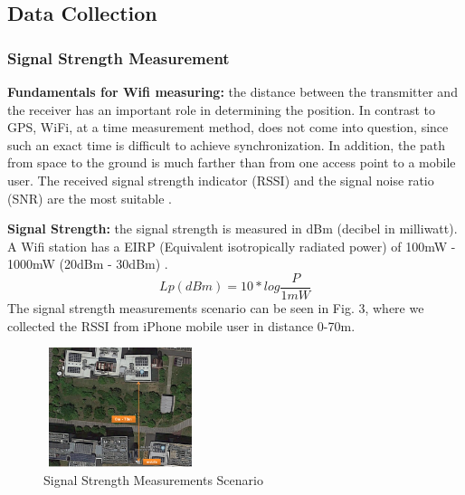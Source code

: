 \documentclass[twocolumn,10pt]{asme2ej}
\begin{document}
	\subsection{Data Collection}
	\subsubsection{Signal Strength Measurement}
	\textbf{Fundamentals for Wifi measuring:} the distance between the transmitter and the receiver has an important role in determining the position. In contrast to GPS, WiFi, at a time measurement method, does not come into question, since such an exact time is difficult to achieve synchronization. In addition, the path from space to the ground is much farther than from one access point to a mobile user. The received signal strength indicator (RSSI) and the signal noise ratio (SNR) are the most suitable \cite{Yuyang}. 
	
	\textbf{Signal Strength:} the signal strength is measured in dBm (decibel in milliwatt). A Wifi station has a EIRP (Equivalent isotropically radiated power) of 100mW - 1000mW (20dBm - 30dBm) \cite{Yuyang}.
	\begin{equation}
	Lp(dBm) = 10 * log \frac{P}{1mW}
	\end{equation}
	The signal strength measurements scenario can be seen in Fig. 3, where we collected the RSSI from iPhone mobile user in distance 0-70m. 
	\begin{figure}[t]
		\begin{center}
			\setlength{\unitlength}{0.012500in}%
			\includegraphics[width=0.4\textwidth,height=35mm]{Fig3_2SigScenario}
		\end{center}
		\caption{Signal Strength Measurements Scenario}
		\label{RSSI Scenario} 
	\end{figure}
	
\end{document}
